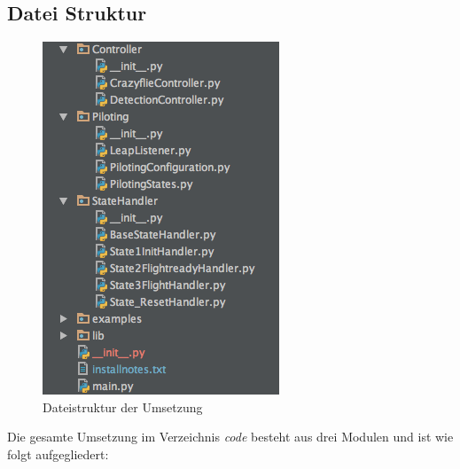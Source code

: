 \subsection{Datei Struktur}
\begin{figure}
	\includegraphics[width=1.0\linewidth]{figures/poc/filestructure.png}
	\caption{Dateistruktur der Umsetzung}
\end{figure}
Die gesamte Umsetzung im Verzeichnis \textit{code} besteht aus drei Modulen und ist wie folgt aufgegliedert:

